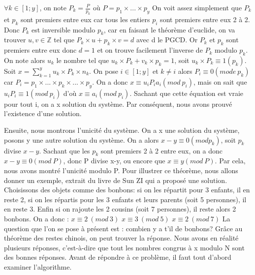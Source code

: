 \documentclass[a4paper, 11pt]{report}
\begin{document}
$\forall k \in [1;y] $, on note $P_k=\frac{P}{p_k} $ où $P=p_1 \times  ... \times p_y$ \newline
On voit assez simplement que $P_k$ et $p_k$ sont premiers entre eux car tous les entiers $p_i$ sont premiers entre eux 2 à 2. Donc $P_k$ est inversible modulo 
$p_k$, car en faisant le théorème d'euclide, on va trouver $u,v\in \mathbb{Z}$ tel que $P_k\times u + p_k \times v = d$ avec d le PGCD. Or $P_k$ et $p_k$ sont premiers entre eux donc $d=1$ et on trouve facilement l'inverse de $P_k$ modulo $p_k$. \newline
On note alors $u_k$ le nombre tel que $u_k\times P_k + v_k\times p_k= 1$, soit $u_k\times P_k\equiv 1(p_k)$. \newline
Soit $x=\sum_{k = 1}^{y} u_k\times P_k\times n_k$. On pose $i\in [1;y]$ et $k\neq i$ alors $P_i\equiv 0(mode \: p_k)$ car $P_i=p_1\times ... \times p_k \times ...\times p_y$. \newline
On a donc $x\equiv u_i P_i a_i(mod \: p_i)$, mais on sait que $u_i P_i\equiv 1 (mod \: p_i)$ d'où $x\equiv a_i (mod \: p_i)$. Sachant que cette équation est vraie pour tout i, on a x solution du système. \newline
Par conséquent, nous avons prouvé l'existence d'une solution.

Ensuite, nous montrons l'unicité du système. \newline
On a x une solution du système, posons y une autre solution du système. On a alors $x-y\equiv 0( mod p_k)$, soit $p_k$ divise $x-y$. Sachant que les $p_k$ sont premiers 2 à 2 entre eux, on a donc $x-y\equiv 0(mod \: P)$, donc P divise x-y, ou encore que $x\equiv y (mod \: P)$. Par cela, nous avons montré l'unicité modulo P.
\newline
\newline
\newline
\newline
\newline
Pour illustrer ce théorème, nous allons donner un exemple, extrait du livre de Sun ZI qui a proposé une solution.
\newline
Choisissons des objets comme des bonbons: si on les répartit pour 3 enfants, il en reste 2, si on les répartis
pour les 3 enfants et leurs parents (soit 5 personnes), il en reste 3. Enfin si on rajoute les 2 cousins
(soit 7 personnes), il reste alors 2 bonbons. On a donc :
\newline 
\newline
$ x\equiv 2 \: (mod \:  3)$ 
\newline
$ x\equiv 3 \: (mod \: 5)$
\newline
$ x\equiv 2 \:(mod\: 7)$
\newline
\newline 
La question que l'on se pose à présent est : combien y a t'il de bonbons?
\newline
Grâce au théorème des restes chinois, on peut trouver la réponse. Nous avons en réalité plusieurs réponses, c'est-à-dire que tout les nombres congrus à x modulo N sont des bonnes réponses.
Avant de répondre à ce problème, il faut tout d'abord examiner l'algorithme.
\end{document}

